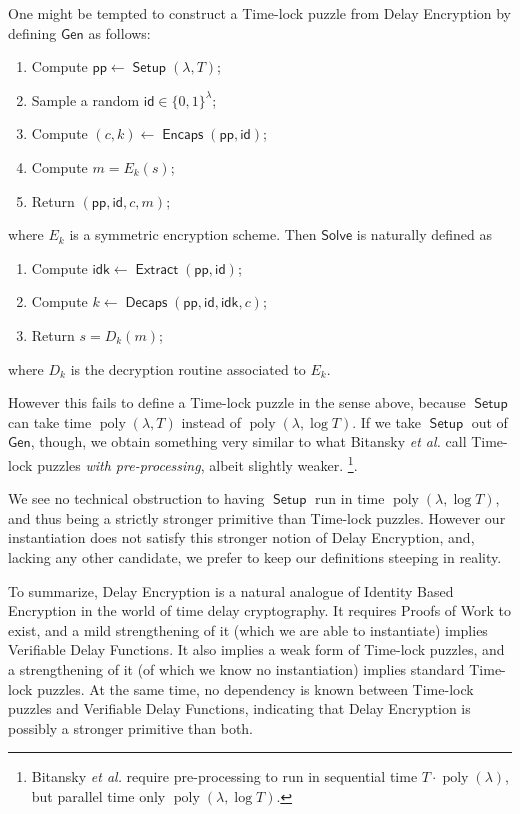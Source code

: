 \documentclass{llncs}
\DeclareMathOperator{\poly}{poly}
\DeclareMathOperator{\Setup}{\mathsf{Setup}}
\DeclareMathOperator{\Extract}{\mathsf{Extract}}
\DeclareMathOperator{\Encaps}{\mathsf{Encaps}}
\DeclareMathOperator{\Decaps}{\mathsf{Decaps}}
\newcommand{\pp}{\mathsf{pp}}
\newcommand{\id}{\mathsf{id}}
\newcommand{\idk}{\mathsf{idk}}
\begin{document}
One might be tempted to construct a Time-lock puzzle from Delay
Encryption by defining $\mathsf{Gen}$ as follows:
\begin{enumerate}
\item Compute $\pp \gets \Setup(\lambda,T)$;
\item Sample a random $\id\in\{0,1\}^\lambda$;
\item Compute $(c,k) \gets \Encaps(\pp, \id)$;
\item Compute $m = E_k(s)$;
\item Return $(\pp,\id,c,m)$;
\end{enumerate}
where $E_k$ is a symmetric encryption scheme. %
Then $\mathsf{Solve}$ is naturally defined as
\begin{enumerate}
\item Compute $\idk \gets \Extract(\pp,\id)$;
\item Compute $k \gets \Decaps(\pp,\id,\idk,c)$;
\item Return $s = D_k(m)$;
\end{enumerate}
where $D_k$ is the decryption routine associated to $E_k$. %

However this fails to define a Time-lock puzzle in the sense above,
because $\Setup$ can take time $\poly(\lambda,T)$ instead of
$\poly(\lambda,\log T)$. %
If we take $\Setup$ out of $\mathsf{Gen}$, though, we obtain something
very similar to what Bitansky \emph{et al.} call Time-lock puzzles
\emph{with pre-processing}, albeit slightly weaker.%
\footnote{Bitansky \emph{et al.} require pre-processing to run in
  sequential time $T\cdot\poly(\lambda)$, but parallel time only
  $\poly(\lambda,\log T)$.}.

We see no technical obstruction to having $\Setup$ run in time
$\poly(\lambda,\log T)$, and thus being a strictly stronger primitive
than Time-lock puzzles. %
However our instantiation does not satisfy this stronger notion of
Delay Encryption, and, lacking any other candidate, we prefer to keep
our definitions steeping in reality.

\medskip

To summarize, Delay Encryption is a natural analogue of Identity Based
Encryption in the world of time delay cryptography. %
It requires Proofs of Work to exist, and a mild strengthening of it
(which we are able to instantiate) implies Verifiable Delay
Functions. %
It also implies a weak form of Time-lock puzzles, and a strengthening
of it (of which we know no instantiation) implies standard Time-lock
puzzles. %
At the same time, no dependency is known between Time-lock puzzles and
Verifiable Delay Functions, indicating that Delay Encryption is
possibly a stronger primitive than both.
\end{document}
